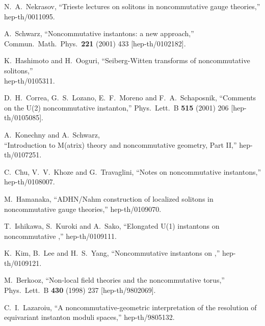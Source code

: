 \documentclass[a4paper,11pt]{article}
\numberwithin{equation}{section}
\providecommand{\R}{\mathbb R}
\begin{document}
{\begin{thebibliography}{99}
N.~A.~Nekrasov,
``Trieste lectures on solitons in noncommutative gauge theories,''\\
hep-th/0011095.

A.~Schwarz,
``Noncommutative instantons: a new approach,''\\
Commun.\ Math.\ Phys.\  {\bf 221} (2001) 433
[hep-th/0102182].

K.~Hashimoto and H.~Ooguri,
``Seiberg-Witten transforms of noncommutative solitons,''\\
hep-th/0105311.

D.~H.~Correa, G.~S.~Lozano, E.~F.~Moreno and F.~A.~Schaposnik,
``Comments on the U(2) noncommutative instanton,''
Phys.\ Lett.\ B {\bf 515} (2001) 206
[hep-th/0105085].

A.~Konechny and A.~Schwarz,\\
``Introduction to M(atrix) theory and noncommutative geometry, Part II,''
hep-th/0107251.

C.~Chu, V.~V.~Khoze and G.~Travaglini,
``Notes on noncommutative instantons,''\\
hep-th/0108007.

M.~Hamanaka,
``ADHN/Nahm construction of localized solitons in 
  noncommutative gauge theories,''
hep-th/0109070.

T.~Ishikawa, S.~Kuroki and A.~Sako,
``Elongated U(1) instantons on noncommutative \myHighlight{$\R^4$}\coordHE{},''
hep-th/0109111.

K.~Kim, B.~Lee and H.~S.~Yang,
``Noncommutative instantons on \myHighlight{$\R^2_{NC} \times \R^2_C$}\coordHE{},''
hep-th/0109121.

M.~Berkooz,
``Non-local field theories and the noncommutative torus,''\\
Phys.\ Lett.\ B {\bf 430} (1998) 237
[hep-th/9802069].

C.~I.~Lazaroiu,
``A noncommutative-geometric interpretation of the resolution of  
  equivariant instanton moduli spaces,''
hep-th/9805132.


\end{thebibliography}}
\end{document}
